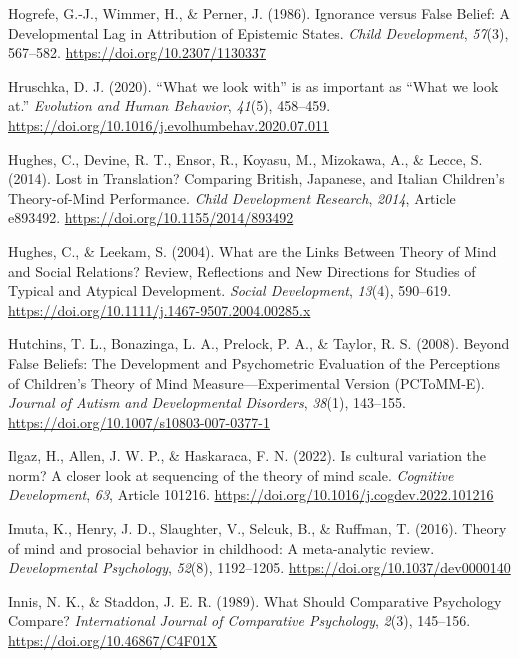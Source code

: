 \documentclass[
]{scrbook}
\newlength{\cslhangindent}
\newenvironment{CSLReferences}[2] %
 {\begin{list}{}{%
  \setlength{\itemindent}{0pt}
  \setlength{\leftmargin}{0pt}
  \setlength{\parsep}{0pt}
  \ifodd #1
   \setlength{\leftmargin}{\cslhangindent}
   \setlength{\itemindent}{-1\cslhangindent}
  \fi
  \setlength{\itemsep}{#2\baselineskip}}}
 {\end{list}}
\begin{document}
\begin{CSLReferences}{1}{0}
Hogrefe, G.-J., Wimmer, H., \& Perner, J. (1986). Ignorance versus {False Belief}: {A Developmental Lag} in {Attribution} of {Epistemic States}. \emph{Child Development}, \emph{57}(3), 567--582. \url{https://doi.org/10.2307/1130337}

Hruschka, D. J. (2020). {``{What} we look with''} is as important as {``{What} we look at.''} \emph{Evolution and Human Behavior}, \emph{41}(5), 458--459. \url{https://doi.org/10.1016/j.evolhumbehav.2020.07.011}

Hughes, C., Devine, R. T., Ensor, R., Koyasu, M., Mizokawa, A., \& Lecce, S. (2014). Lost in {Translation}? {Comparing British}, {Japanese}, and {Italian Children}'s {Theory-of-Mind Performance}. \emph{Child Development Research}, \emph{2014}, Article e893492. \url{https://doi.org/10.1155/2014/893492}

Hughes, C., \& Leekam, S. (2004). What are the {Links Between Theory} of {Mind} and {Social Relations}? {Review}, {Reflections} and {New Directions} for {Studies} of {Typical} and {Atypical Development}. \emph{Social Development}, \emph{13}(4), 590--619. \url{https://doi.org/10.1111/j.1467-9507.2004.00285.x}

Hutchins, T. L., Bonazinga, L. A., Prelock, P. A., \& Taylor, R. S. (2008). Beyond {False Beliefs}: {The Development} and {Psychometric Evaluation} of the {Perceptions} of {Children}'s {Theory} of {Mind Measure}---{Experimental Version} ({PCToMM-E}). \emph{Journal of Autism and Developmental Disorders}, \emph{38}(1), 143--155. \url{https://doi.org/10.1007/s10803-007-0377-1}

Ilgaz, H., Allen, J. W. P., \& Haskaraca, F. N. (2022). Is cultural variation the norm? {A} closer look at sequencing of the theory of mind scale. \emph{Cognitive Development}, \emph{63}, Article 101216. \url{https://doi.org/10.1016/j.cogdev.2022.101216}

Imuta, K., Henry, J. D., Slaughter, V., Selcuk, B., \& Ruffman, T. (2016). Theory of mind and prosocial behavior in childhood: {A} meta-analytic review. \emph{Developmental Psychology}, \emph{52}(8), 1192--1205. \url{https://doi.org/10.1037/dev0000140}

Innis, N. K., \& Staddon, J. E. R. (1989). What {Should Comparative Psychology Compare}? \emph{International Journal of Comparative Psychology}, \emph{2}(3), 145--156. \url{https://doi.org/10.46867/C4F01X}


\end{CSLReferences}
\end{document}
